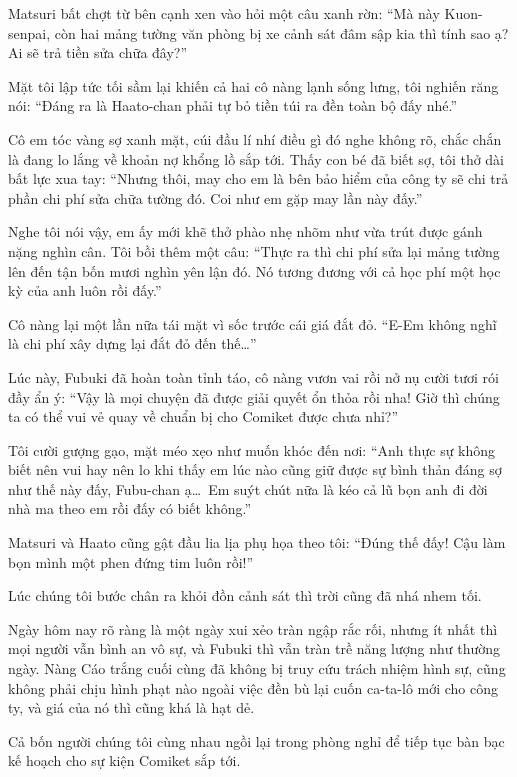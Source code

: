 \documentclass[../main.tex]{subfiles}
\begin{document}
Matsuri bất chợt từ bên cạnh xen vào hỏi một câu xanh rờn:
``Mà này Kuon-senpai, còn hai mảng tường văn phòng bị xe cảnh sát đâm sập kia thì tính sao ạ? Ai sẽ trả tiền sửa chữa đây?''

Mặt tôi lập tức tối sầm lại khiến cả hai cô nàng lạnh sống lưng, tôi nghiến răng nói:
``Đáng ra là Haato-chan phải tự bỏ tiền túi ra đền toàn bộ đấy nhé.''

Cô em tóc vàng sợ xanh mặt, cúi đầu lí nhí điều gì đó nghe không rõ, chắc chắn là đang lo lắng về khoản nợ khổng lồ sắp tới. Thấy con bé đã biết sợ, tôi thở dài bất lực xua tay:
``Nhưng thôi, may cho em là bên bảo hiểm của công ty sẽ chi trả phần chi phí sửa chữa tường đó. Coi như em gặp may lần này đấy.''

Nghe tôi nói vậy, em ấy mới khẽ thở phào nhẹ nhõm như vừa trút được gánh nặng nghìn cân. Tôi bồi thêm một câu: ``Thực ra thì chi phí sửa lại mảng tường lên đến tận bốn mươi nghìn yên lận đó. Nó tương đương với cả học phí một học kỳ của anh luôn rồi đấy.''

Cô nàng lại một lần nữa tái mặt vì sốc trước cái giá đắt đỏ.
``E-Em không nghĩ là chi phí xây dựng lại đắt đỏ đến thế\dots''

Lúc này, Fubuki đã hoàn toàn tỉnh táo, cô nàng vươn vai rồi nở nụ cười tươi rói đầy ẩn ý:
``Vậy là mọi chuyện đã được giải quyết ổn thỏa rồi nha! Giờ thì chúng ta có thể vui vẻ quay về chuẩn bị cho Comiket được chưa nhỉ?''

Tôi cười gượng gạo, mặt méo xẹo như muốn khóc đến nơi:
``Anh thực sự không biết nên vui hay nên lo khi thấy em lúc nào cũng giữ được sự bình thản đáng sợ như thế này đấy, Fubu-chan ạ\dots\ Em suýt chút nữa là kéo cả lũ bọn anh đi đời nhà ma theo em rồi đấy có biết không.''

Matsuri và Haato cũng gật đầu lia lịa phụ họa theo tôi:
``Đúng thế đấy! Cậu làm bọn mình một phen đứng tim luôn rồi!''

\ct

Lúc chúng tôi bước chân ra khỏi đồn cảnh sát thì trời cũng đã nhá nhem tối.

Ngày hôm nay rõ ràng là một ngày xui xẻo tràn ngập rắc rối, nhưng ít nhất thì mọi người vẫn bình an vô sự, và Fubuki thì vẫn tràn trề năng lượng như thường ngày. Nàng Cáo trắng cuối cùng đã không bị truy cứu trách nhiệm hình sự, cũng không phải chịu hình phạt nào ngoài việc đền bù lại cuốn ca-ta-lô mới cho công ty, và giá của nó thì cũng khá là hạt dẻ.

Cả bốn người chúng tôi cùng nhau ngồi lại trong phòng nghỉ để tiếp tục bàn bạc kế hoạch cho sự kiện Comiket sắp tới.
\end{document}
